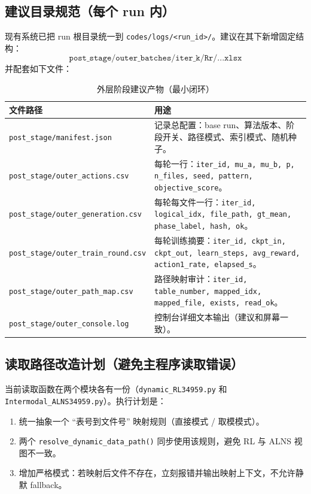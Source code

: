 \documentclass[UTF8,11pt,a4paper]{ctexart}
\begin{document}
\subsection{建议目录规范（每个 run 内）}
现有系统已把 run 根目录统一到 \texttt{codes/logs/<run\_id>/}。建议在其下新增固定结构：
\begin{equation}
\texttt{post\_stage/outer\_batches/iter\_k/Rr/...xlsx}
\end{equation}
并配套如下文件：
\begin{table}[H]
\centering
\caption{外层阶段建议产物（最小闭环）}
\begin{tabular}{p{5.4cm}p{10.0cm}}
\toprule
文件路径 & 用途 \\
\midrule
\texttt{post\_stage/manifest.json} & 记录总配置：base run、算法版本、阶段开关、路径模式、索引模式、随机种子。 \\
\texttt{post\_stage/outer\_actions.csv} & 每轮一行：\texttt{iter\_id, mu\_a, mu\_b, p, n\_files, seed, pattern, objective\_score}。 \\
\texttt{post\_stage/outer\_generation.csv} & 每轮每文件一行：\texttt{iter\_id, logical\_idx, file\_path, gt\_mean, phase\_label, hash, ok}。 \\
\texttt{post\_stage/outer\_train\_round.csv} & 每轮训练摘要：\texttt{iter\_id, ckpt\_in, ckpt\_out, learn\_steps, avg\_reward, action1\_rate, elapsed\_s}。 \\
\texttt{post\_stage/outer\_path\_map.csv} & 路径映射审计：\texttt{iter\_id, table\_number, mapped\_idx, mapped\_file, exists, read\_ok}。 \\
\texttt{post\_stage/outer\_console.log} & 控制台详细文本输出（建议和屏幕一致）。 \\
\bottomrule
\end{tabular}
\end{table}

\subsection{读取路径改造计划（避免主程序读取错误）}
当前读取函数在两个模块各有一份（\texttt{dynamic\_RL34959.py} 和 \texttt{Intermodal\_ALNS34959.py}）。执行计划是：
\begin{enumerate}
\item 统一抽象一个 ``表号到文件号'' 映射规则（直接模式 / 取模模式）。
\item 两个 \texttt{resolve\_dynamic\_data\_path()} 同步使用该规则，避免 RL 与 ALNS 视图不一致。
\item 增加严格模式：若映射后文件不存在，立刻报错并输出映射上下文，不允许静默 fallback。
\end{enumerate}
\end{document}
